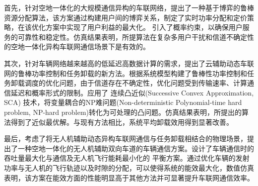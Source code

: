 首先，针对空地一体化的大规模通信异构的车联网络，提出了一种基于博弈的鲁棒资源分配算法，该方案通过构建用户间的博弈关系，制定了实时功率分配和定价策略，在该优化方案中实现了用户利益的最大化。
引入了概率约束，以确保用户服务的可靠性和稳定性。仿真结果表明，所提算法在复杂多用户干扰和信道不确定性的空地一体化异构车联网通信场景下是有效的。

其次，针对车辆网络越来越高的低延迟高数据计算的需求，提出了云辅助动态车联网的鲁棒功率控制和任务卸载的新方法。根据系统模型构建了鲁棒性功率控制和任务卸载调度的优化问题，由于信道存在不确定性，优化问题受到传输速率、计算通信延迟和概率形式的限制。应用了 连续凸近似(Successive Convex Approximation, SCA) 技术，将变量耦合的NP难问题(Non-deterministic Polynomial-time hard problem, NP-hard problem)转化为可处理的凸问题。仿真结果表明，所提出的算法得到了近似最优解。与现有方法相比，系统平均卸载效用得到显著改善。

最后，考虑了将无人机辅助动态异构车联网通信与任务卸载相结合的物理场景，提出了一种空地一体化的无人机辅助双向车道的车辆通信方案。设计了车辆通信时的吞吐量最大化与通信及无人机飞行能耗最小化的
平衡方案。通过优化车辆的发射功率与无人机的飞行轨迹以及时隙的分配，可以使得系统的能效最大化，数值仿真表明，该方案在能效方面的性能明显高于其他方法并可显著提升车联网通信效率。

\begin{keywords}
\mykeywords
\end{keywords}

\makeatletter
{}  \CAST@value@classification   %
\makeatother

\newpage\ \vspace{-2.5em}
\vspace{0.23cm}   %
\begin{center}
\makeatletter
{}\textbf{\timesfont{\CAST@value@entitle}}    %
\makeatother
\end{center}

